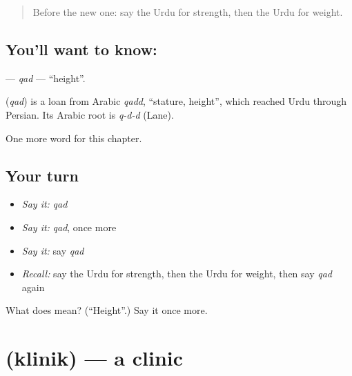 \label{lesson:UR-C243-qad}



\begin{quote}
Before the new one: say the Urdu for strength, then the Urdu for weight.
\end{quote}

\subsection*{You'll want to know: }
\textbf{} — \emph{qad} — \textquotedblleft{}height\textquotedblright{}.

\begin{cousinweb}
\textbf{} (\emph{qad}) is a loan from Arabic \emph{qadd}, \textquotedblleft{}stature, height\textquotedblright{}, which reached Urdu through Persian. Its Arabic root is \emph{q-d-d} (Lane).
\end{cousinweb}

\begin{grammarlens}[title={What you've built}]
One more word for this chapter.
\end{grammarlens}

\subsection*{Your turn}
\begin{itemize}
\raggedright
  \item \emph{Say it:} \emph{qad}
  \item \emph{Say it:} \emph{qad}, once more
  \item \emph{Say it:} say \emph{qad}
  \item \emph{Recall:} say the Urdu for strength, then the Urdu for weight, then say \emph{qad} again
\end{itemize}

\begin{tcolorbox}[breakable,colback=teal!4,colframe=teal!35!black,title={Before you move on}]
What does  mean? (\textquotedblleft{}Height\textquotedblright{}.) Say it once more.
\end{tcolorbox}
\section[\texorpdfstring{\ur{کلینک} (klinik)}{کلینک (klinik)}]{ (klinik) — a clinic}

\label{lesson:UR-C243-klinik}



